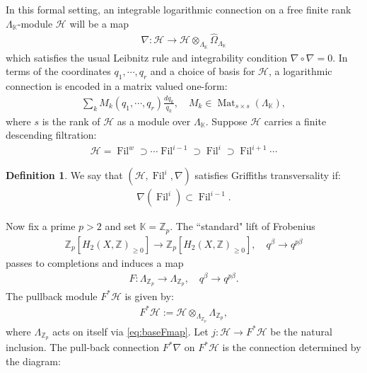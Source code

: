 \documentclass[reqno]{amsart}
\numberwithin{equation}{section}
\numberwithin{equation}{section}
\numberwithin{equation}{section}
\theoremstyle{definition}
\newtheorem{defn}[thm]{Definition}
\theoremstyle{remark}
\theoremstyle{remark}
\newcommand{\calH}{\mathcal{H}}
\begin{document}
In this formal setting, an integrable logarithmic connection on a free finite rank $\Lambda_\mathbb{K}$-module $\calH$ will be a map \begin{align} \nabla: \calH \to \calH \otimes_{\Lambda_\mathbb{K}}\hat{\Omega}_{\Lambda_\mathbb{K}}  \end{align} which satisfies the usual Leibnitz rule and integrability condition $\nabla \circ \nabla=0.$ In terms of the coordinates $q_1,\cdots,q_r$ and a choice of basis for $\calH$, a logarithmic connection is encoded in a matrix valued one-form: 
\begin{align} \label{eq:connectioncoordinates} \sum_k M_k(q_1,\cdots,q_r)\frac{dq_k}{q_k},\quad M_k \in \operatorname{Mat}_{s\times s} (\Lambda_{\mathbb{K}}),\end{align}
where $s$ is the rank of $\calH$ as a module over $\Lambda_{\mathbb{K}}.$
Suppose $\calH$ carries a finite descending filtration: \begin{align}\label{eq:filtration} \calH=\operatorname{Fil}^w \supset \cdots \operatorname{Fil}^{i-1} \supset \operatorname{Fil}^i \supset \operatorname{Fil}^{i+1}  \cdots \end{align} 
\begin{defn} We say that $(\calH,\operatorname{Fil}^i,\nabla)$  satisfies Griffiths transversality if: \begin{align}\nabla(\operatorname{Fil}^i) \subset \operatorname{Fil}^{i-1}.\end{align}\end{defn}
Now fix a prime $p>2$ and set $\mathbb{K}=\mathbb{Z}_p$. The ``standard" lift of Frobenius \begin{align} \mathbb{Z}_p[H_2(X,\mathbb{Z})_{\geq 0}] \to \mathbb{Z}_p[H_2(X,\mathbb{Z})_{\geq 0}], \quad q^{\beta} \to q^{p\beta} \end{align} passes to completions and induces a map \begin{align} \label{eq:baseFmap} F: \Lambda_{\mathbb{Z}_p} \to \Lambda_{\mathbb{Z}_p}, \quad q^{\beta} \to q^{p\beta}. \end{align} 
The pullback module $F^*\calH$ is given by: \begin{align} F^*\calH := \calH \otimes_{\Lambda_{\mathbb{Z}_p}} \Lambda_{\mathbb{Z}_p}, \end{align} where $\Lambda_{\mathbb{Z}_p}$ acts on itself via \eqref{eq:baseFmap}. Let $j: \calH \to F^*\calH$ be the natural inclusion. The pull-back connection $F^*\nabla$ on $F^*\calH$ is the connection determined by the diagram:
\end{document}
